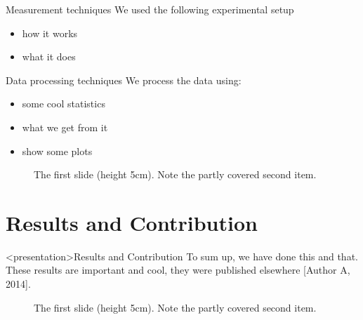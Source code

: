   \begin{frame}{Measurement techniques}
    We used the following experimental setup
    \begin{itemize}
      \item how it works
      \item what it does
    \end{itemize}
  \end{frame}

  \begin{frame}{Data processing techniques}
    We process the data using:
    \begin{itemize}
      \item some cool statistics
      \item what we get from it
      \item show some plots
    \end{itemize}
    \label{slide:data_processing}
  \end{frame}


\begin{figure}
  \begin{center}
  \end{center}
  \caption{The first slide (height 5cm). Note the partly covered second item.}
\end{figure}


\section{Results and Contribution}
  \begin{frame}<presentation>{Results and Contribution}
  To sum up, we have done this and that. These results are important and cool,
  they were published elsewhere [Author A, 2014].
  \label{slide:results}
  \end{frame}

\begin{figure}
  \begin{center}
  \end{center}
  \caption{The first slide (height 5cm). Note the partly covered second item.}
\end{figure}

